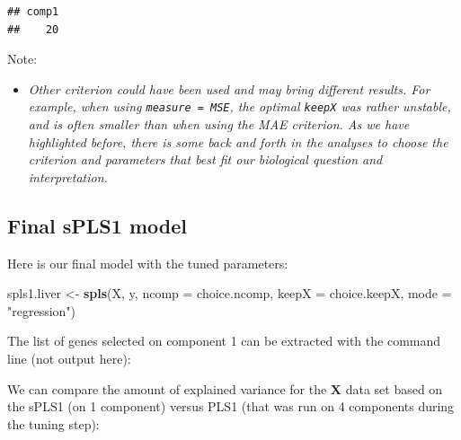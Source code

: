 \documentclass[]{book}
\newenvironment{Shaded}{\begin{snugshade}}{\end{snugshade}}
\newcommand{\DataTypeTok}[1]{\textcolor[rgb]{0.13,0.29,0.53}{#1}}
\newcommand{\DecValTok}[1]{\textcolor[rgb]{0.00,0.00,0.81}{#1}}
\newcommand{\KeywordTok}[1]{\textcolor[rgb]{0.13,0.29,0.53}{\textbf{#1}}}
\newcommand{\NormalTok}[1]{#1}
\newcommand{\OperatorTok}[1]{\textcolor[rgb]{0.81,0.36,0.00}{\textbf{#1}}}
\newcommand{\StringTok}[1]{\textcolor[rgb]{0.31,0.60,0.02}{#1}}
\providecommand{\tightlist}{%
  \setlength{\itemsep}{0pt}\setlength{\parskip}{0pt}}
\begin{document}
\begin{verbatim}
## comp1 
##    20
\end{verbatim}

Note:

\begin{itemize}
\tightlist
\item
  \emph{Other criterion could have been used and may bring different results. For example, when using \texttt{measure\ =\ \textquotesingle{}MSE\textquotesingle{}}, the optimal \texttt{keepX} was rather unstable, and is often smaller than when using the MAE criterion. As we have highlighted before, there is some back and forth in the analyses to choose the criterion and parameters that best fit our biological question and interpretation.}
\end{itemize}

\hypertarget{final-spls1-model}{%
\subsection{Final sPLS1 model}\label{final-spls1-model}}

Here is our final model with the tuned parameters:

\begin{Shaded}
\begin{Highlighting}[]
\NormalTok{spls1.liver <-}\StringTok{ }\KeywordTok{spls}\NormalTok{(X, y, }\DataTypeTok{ncomp =}\NormalTok{ choice.ncomp, }\DataTypeTok{keepX =}\NormalTok{ choice.keepX, }
                    \DataTypeTok{mode =} \StringTok{"regression"}\NormalTok{)}
\end{Highlighting}
\end{Shaded}

The list of genes selected on component 1 can be extracted with the command line (not output here):

\begin{Shaded}
\end{Shaded}

We can compare the amount of explained variance for the \(\boldsymbol X\) data set based on the sPLS1 (on 1 component) versus PLS1 (that was run on 4 components during the tuning step):

\begin{Shaded}
\end{Shaded}
\end{document}
